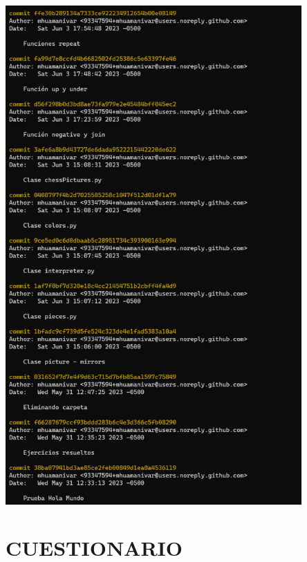 \documentclass{article}
\begin{document}
\begin{minipage}{\linewidth}
  \centering
  \includegraphics[width=0.85\textwidth]{imagenes/commits3.png}
\end{minipage}

\pagebreak


\noindent
\section*{\centering CUESTIONARIO}

\vspace{2\baselineskip}
\end{document}
